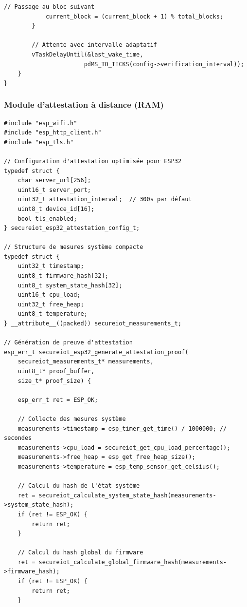 \begin{lstlisting}[caption={Implémentation IVM optimisée ESP32}]
            // Passage au bloc suivant
            current_block = (current_block + 1) % total_blocks;
        }
        
        // Attente avec intervalle adaptatif
        vTaskDelayUntil(&last_wake_time, 
                       pdMS_TO_TICKS(config->verification_interval));
    }
}
\end{lstlisting}

\subsubsection{Module d'attestation à distance (RAM)}

\begin{lstlisting}[caption={Module d'attestation ESP32 optimisé}]
#include "esp_wifi.h"
#include "esp_http_client.h"
#include "esp_tls.h"

// Configuration d'attestation optimisée pour ESP32
typedef struct {
    char server_url[256];
    uint16_t server_port;
    uint32_t attestation_interval;  // 300s par défaut
    uint8_t device_id[16];
    bool tls_enabled;
} secureiot_esp32_attestation_config_t;

// Structure de mesures système compacte
typedef struct {
    uint32_t timestamp;
    uint8_t firmware_hash[32];
    uint8_t system_state_hash[32];
    uint16_t cpu_load;
    uint32_t free_heap;
    uint8_t temperature;
} __attribute__((packed)) secureiot_measurements_t;

// Génération de preuve d'attestation
esp_err_t secureiot_esp32_generate_attestation_proof(
    secureiot_measurements_t* measurements,
    uint8_t* proof_buffer,
    size_t* proof_size) {
    
    esp_err_t ret = ESP_OK;
    
    // Collecte des mesures système
    measurements->timestamp = esp_timer_get_time() / 1000000; // secondes
    measurements->cpu_load = secureiot_get_cpu_load_percentage();
    measurements->free_heap = esp_get_free_heap_size();
    measurements->temperature = esp_temp_sensor_get_celsius();
    
    // Calcul du hash de l'état système
    ret = secureiot_calculate_system_state_hash(measurements->system_state_hash);
    if (ret != ESP_OK) {
        return ret;
    }
    
    // Calcul du hash global du firmware
    ret = secureiot_calculate_global_firmware_hash(measurements->firmware_hash);
    if (ret != ESP_OK) {
        return ret;
    }
    

\end{lstlisting}
